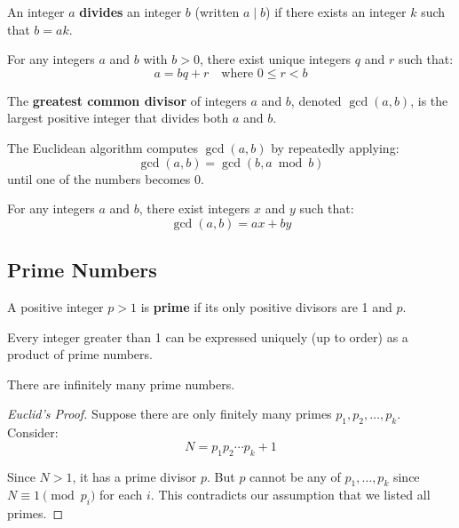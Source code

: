 \begin{definition}[Divisibility]
An integer $a$ \textbf{divides} an integer $b$ (written $a \mid b$) if there exists an integer $k$ such that $b = ak$.
\end{definition}

\begin{theorem}
For any integers $a$ and $b$ with $b > 0$, there exist unique integers $q$ and $r$ such that:
\[a = bq + r \quad \text{where } 0 \leq r < b\]
\end{theorem}

\begin{definition}
The \textbf{greatest common divisor} of integers $a$ and $b$, denoted $\gcd(a, b)$, is the largest positive integer that divides both $a$ and $b$.
\end{definition}

\begin{theorem}
The Euclidean algorithm computes $\gcd(a, b)$ by repeatedly applying:
\[\gcd(a, b) = \gcd(b, a \bmod b)\]
until one of the numbers becomes 0.
\end{theorem}

\begin{theorem}
For any integers $a$ and $b$, there exist integers $x$ and $y$ such that:
\[\gcd(a, b) = ax + by\]
\end{theorem}

\subsection{Prime Numbers}

\begin{definition}
A positive integer $p > 1$ is \textbf{prime} if its only positive divisors are 1 and $p$.
\end{definition}

\begin{theorem}
Every integer greater than 1 can be expressed uniquely (up to order) as a product of prime numbers.
\end{theorem}

\begin{theorem}
There are infinitely many prime numbers.
\end{theorem}

\begin{proof}[Euclid's Proof]
Suppose there are only finitely many primes $p_1, p_2, \ldots, p_k$. Consider:
\[N = p_1 p_2 \cdots p_k + 1\]

Since $N > 1$, it has a prime divisor $p$. But $p$ cannot be any of $p_1, \ldots, p_k$ since $N \equiv 1 \pmod{p_i}$ for each $i$. This contradicts our assumption that we listed all primes.
\end{proof}

